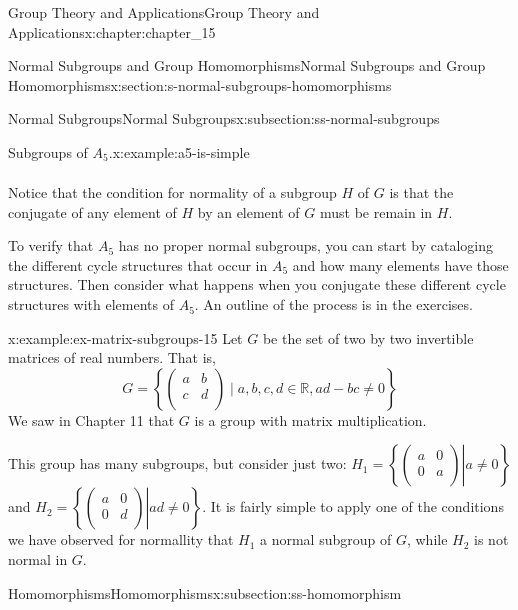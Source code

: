 \documentclass[oneside,10pt,]{book}
\numberwithin{equation}{section}
\begin{document}
\begin{chapterptx}{Group Theory and Applications}{}{Group Theory and Applications}{}{}{x:chapter:chapter_15}
\begin{sectionptx}{Normal Subgroups and Group Homomorphisms}{}{Normal Subgroups and Group Homomorphisms}{}{}{x:section:s-normal-subgroups-homomorphisms}
\begin{subsectionptx}{Normal Subgroups}{}{Normal Subgroups}{}{}{x:subsection:ss-normal-subgroups}
\begin{example}{Subgroups of \(A_5\).}{x:example:a5-is-simple}
\begin{equation*}
\begin{split}
\end{split}
\end{equation*}
%
\par
Notice that the condition for normality of a subgroup \(H\) of \(G\) is that the conjugate of any element of \(H\) by an element of \(G\) must be remain in \(H\).%
\par
To verify that \(A_5\) has no proper normal subgroups, you can start by cataloging the different cycle structures that occur in \(A_5\) and how many elements have those structures.   Then consider what happens when you conjugate these different cycle structures with elements of \(A_5\). An outline of the process is in the exercises.%
\end{example}
\begin{example}{}{x:example:ex-matrix-subgroups-15}%
Let \(G\) be the set of two by two invertible matrices of real numbers.  That is,%
\begin{equation*}
G=\left\{\left(
\begin{array}{cc}
a & b \\
c & d \\
\end{array}
\right) \mid a,b,c,d\in \mathbb{R}, a d-b c\neq 0\right\}
\end{equation*}
We saw in Chapter 11 that \(G\) is a group with matrix multiplication.%
\par
This group has many subgroups, but consider just two: \(H_1=\left\{\left.\left(
\begin{array}{cc}
a & 0 \\
0 & a \\
\end{array}
\right)\right| a \neq 0\right\}\)   and \(H_2=\left\{\left.\left(
\begin{array}{cc}
a & 0 \\
0 & d \\
\end{array}
\right)\right| a d \neq 0\right\}\). It is fairly simple to apply one of the conditions we have observed for normallity that \(H_1\) a normal subgroup of \(G\), while \(H_2\) is not normal in \(G\).%
\end{example}
\end{subsectionptx}
%
%
\typeout{************************************************}
\typeout{************************************************}
%
\begin{subsectionptx}{Homomorphisms}{}{Homomorphisms}{}{}{x:subsection:ss-homomorphism}

\end{subsectionptx}
\end{sectionptx}
\end{chapterptx}
\end{document}
